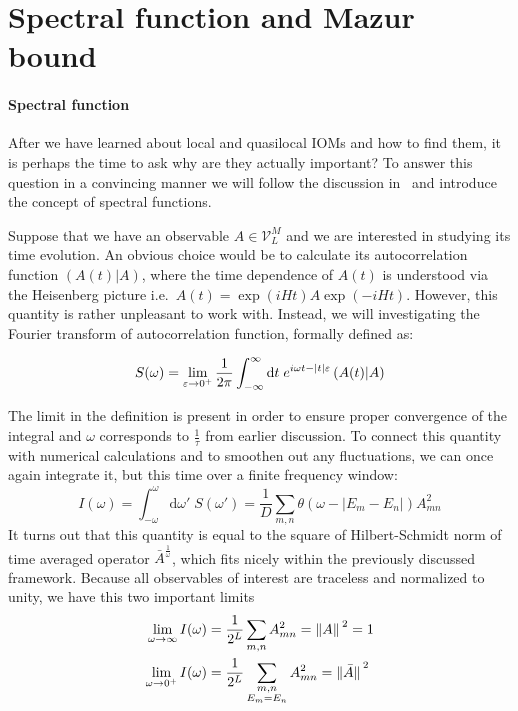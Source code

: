 
\section{Spectral function and Mazur bound\label{sec:spectral function}}

\paragraph{Spectral function}After we have learned about local and quasilocal IOMs and how to find them, it is perhaps the 
time to ask why are they actually important? To answer this question in a convincing manner we 
will follow the discussion in~\textcite{Vidmar2021} and introduce the concept of spectral
functions. 

Suppose that we have an observable \(A \in \mathcal{V}_L^M\) and we are interested in studying its time
evolution. An obvious choice would be to calculate its autocorrelation function
\((A(t)|A)\), where the time dependence of \(A(t)\) is understood
via the Heisenberg picture i.e.\ \(A(t) = \exp\left(i H t\right) A
\exp\left(-i H t\right)\). However, this quantity is rather unpleasant to work with.
Instead, we will investigating the Fourier transform of autocorrelation function, formally
defined as:
\begin{definition}  
  \begin{equation*}
  S(\omega) =  \lim _{\varepsilon \to 0^+} \frac{1}{2 \pi} \int_{-\infty}^{\infty} \mathrm{d} t 
  \; e^{i \omega t-|t| \varepsilon}\left(A(t) \middle| A\right)
  \end{equation*}
  \label{def:spectral function}
\end{definition}
The limit in the definition is present in order to ensure proper convergence of the integral
and \(\omega{}\) corresponds to \(\frac{1}{\tau}\) from earlier discussion.
To connect this quantity with numerical calculations and to smoothen out any fluctuations, we
can once again integrate it, but this time over a finite frequency window:
\begin{equation}
  I(\omega) = \int_{-\omega}^{\omega} \mathrm{d}\omega' \; S(\omega') = 
  \frac{1}{D} \sum_{m,n} \theta\left(\omega - |E_m-E_n|\right) A_{mn}^2
\end{equation}
It turns out that this quantity is equal to the square of Hilbert-Schmidt norm of time
averaged operator \(\bar{A}^{\frac{1}{\omega}}\), which fits nicely within the previously
discussed framework. Because all observables of interest are traceless and
normalized to unity, we have this two important limits
\begin{align}
  \lim_{\omega \to \infty } I(\omega) &= \frac{1}{2^L}\sum_{m,n} A_{mn}^2 = \norm*{A}^2 = 1\\
  \lim_{\omega \to 0^+ } I(\omega) &= \frac{1}{2^L} \sum_{ \substack{m,n\\E_m=E_n} } A_{mn}^2 = \norm*{\bar{A}}^2
\end{align}

